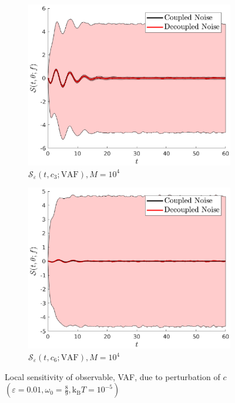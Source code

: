 \documentclass[a4paper,10pt]{beamer}
\newcommand{\rb}[1]{\left( #1 \right)}
\begin{document}
\begin{frame}
\begin{figure}[H]
\begin{subfigure}{0.32\linewidth}
			\end{subfigure}
			\begin{subfigure}{0.32\linewidth}
				\includegraphics[width=\linewidth]{./Plots/sensitivityAnalysis/c3M10000.eps}
				\caption{\tiny $\mathcal{S}_{\varepsilon} \rb{t,c_{3};\text{VAF}}, M = 10^{4}$}
			\end{subfigure}
			\begin{subfigure}{0.32\linewidth}
				\includegraphics[width=\linewidth]{./Plots/sensitivityAnalysis/c6M10000.eps}
				\caption{\tiny $\mathcal{S}_{\varepsilon} \rb{t,c_{6};\text{VAF}}, M = 10^{4}$}
			\end{subfigure}
			\caption{Local sensitivity of observable, VAF, due to perturbation of $c$ $\rb{\varepsilon = 0.01, \omega_{0} = \frac{8}{9}, \text{k}_{\text{B}} T = 10^{-5}}$}
		\end{figure}
	\end{frame}
\end{document}
